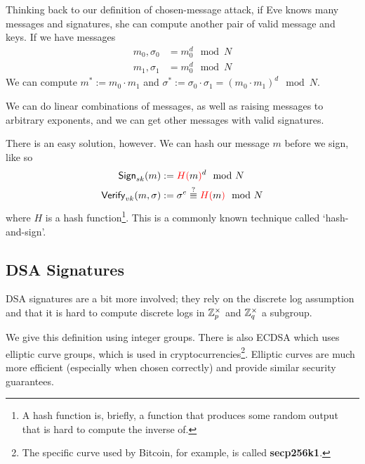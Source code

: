 Thinking back to our definition of chosen-message attack, if Eve knows many messages and signatures, she can compute another pair of valid message and keys. If we have messages
\begin{align*}
    m_0, \sigma_0 & = m_0^d\mod N \\
    m_1, \sigma_1 & = m_0^d\mod N
\end{align*}
We can compute $m^* := m_0\cdot m_1$ and $\sigma^* := \sigma_0 \cdot \sigma_1 = (m_0\cdot m_1)^d\mod N$.

We can do linear combinations of messages, as well as raising messages to arbitrary exponents, and we can get other messages with valid signatures.

There is an easy solution, however. We can hash our message $m$ before we sign, like so
\begin{align*}
    \operatorname{\mathsf{Sign}}_{sk}(m)           & := {\color{red}H(}m{\color{red})}^d\mod{N}                         \\
    \operatorname{\mathsf{Verify}}_{vk}(m, \sigma) & := \sigma^e\overset{?}{\equiv}{\color{red}H(}m{\color{red})}\mod N
\end{align*}
where $H$ is a hash function\footnote{A hash function is, briefly, a function that produces some random output that is hard to compute the inverse of.}. This is a commonly known technique called `hash-and-sign'.

\subsection{DSA Signatures}
DSA signatures are a bit more involved; they rely on the discrete log assumption and that it is hard to compute discrete logs in $\mathbb Z_p^\times$ and $\mathbb Z_q^\times$ a subgroup.

We give this definition using integer groups. There is also ECDSA which uses elliptic curve groups, which is used in cryptocurrencies\footnote{The specific curve used by Bitcoin, for example, is called \textbf{secp256k1}.}. Elliptic curves are much more efficient (especially when chosen correctly) and provide similar security guarantees.

